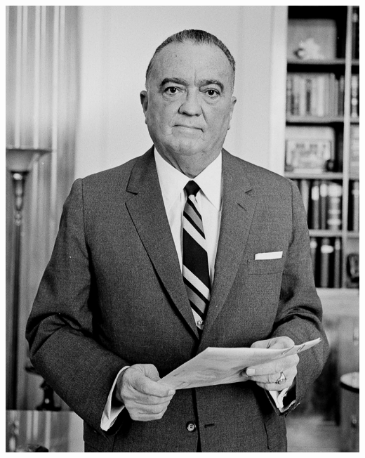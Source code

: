 \documentclass{puzzlehunt}
\begin{document}
\begin{center}
  \includegraphics[width=.5\linewidth]{jeh.jpg}
\end{center}
%
%
%
%
%
%
%
%
%
%
\end{document}
